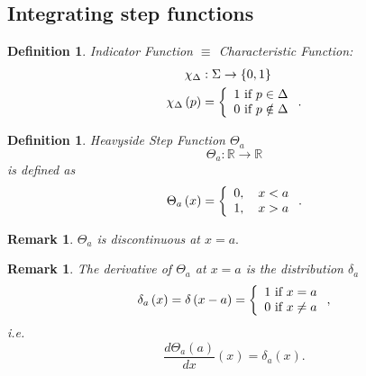 \documentclass[aps,preprint]{revtex4}%
\newtheorem{definition}[theorem]{Definition}
\newtheorem{remark}[theorem]{Remark}
\begin{document}
\subsection{Integrating step functions}

\begin{definition}
Indicator Function $\equiv$ Characteristic Function:
\begin{align}
\chi_{\Delta}  &  :\Sigma\rightarrow\left\{  0,1\right\} \\
\chi_{\Delta}\left(  p\right)   &  =\left\{
\begin{array}
[c]{c}%
1\text{ if }p\in\Delta\\
0\text{ if }p\notin\Delta
\end{array}
\right.  .
\end{align}

\end{definition}

\begin{definition}
Heavyside Step Function $\Theta_{a}$%
\begin{equation}
\Theta_{a}:\mathbb{R}\rightarrow\mathbb{R}%
\end{equation}
is defined as
\begin{equation}
\Theta_{a}\left(  x\right)  =\left\{
\begin{array}
[c]{c}%
0,\quad x<a\\
1,\quad x>a
\end{array}
\right.  .
\end{equation}

\end{definition}

\begin{remark}
$\Theta_{a}$ is discontinuous at $x=a.$
\end{remark}

\begin{remark}
The derivative of $\Theta_{a}$ at $x=a$ is the \emph{distribution} $\delta
_{a}$%
\begin{equation}
\delta_{a}\left(  x\right)  =\delta\left(  x-a\right)  =\left\{
\begin{array}
[c]{c}%
1\text{ if }x=a\\
0\text{ if }x\neq a
\end{array}
\right.  ,
\end{equation}
i.e.%
\begin{equation}
\frac{d\Theta_{a}\left(  a\right)  }{dx}\left(  x\right)  =\delta_{a}\left(
x\right)  .
\end{equation}

\end{remark}
\end{document}
